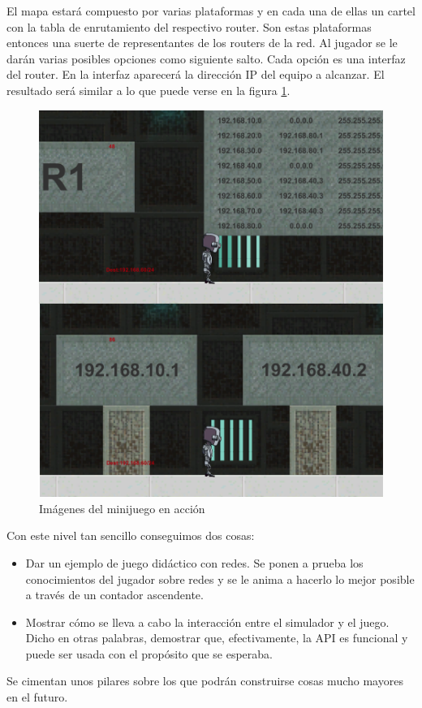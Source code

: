 El mapa estará compuesto por varias plataformas y en cada una de ellas un cartel con la tabla de enrutamiento del respectivo router. Son estas plataformas entonces una suerte de representantes de los routers de la red. Al jugador se le darán varias posibles opciones como siguiente salto. Cada opción es una interfaz del router. En la interfaz aparecerá la dirección IP del equipo a alcanzar. El resultado será similar a lo que puede verse en la figura \ref{fig:juegoaccion}.

\begin{figure}[H]
  \centering
  \includegraphics[scale=0.1]{imagenes/juegoaccion}
  \caption{Imágenes del minijuego en acción}
  \label{fig:juegoaccion}
\end{figure}

Con este nivel tan sencillo conseguimos dos cosas:
\begin{itemize}
\item Dar un ejemplo de juego didáctico con redes. Se ponen a prueba los conocimientos del jugador sobre redes y se le anima a hacerlo lo mejor posible a través de un contador ascendente.
\item Mostrar cómo se lleva a cabo la interacción entre el simulador y el juego. Dicho en otras palabras, demostrar que, efectivamente, la API es funcional y puede ser usada con el propósito que se esperaba.
\end{itemize}

Se cimentan unos pilares sobre los que podrán construirse cosas mucho mayores en el futuro.